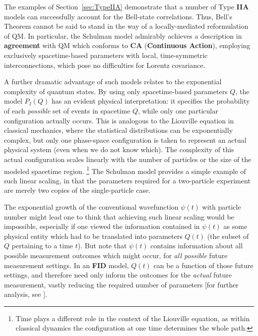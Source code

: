 \documentclass[rmp, aps, preprint, longbibliography]{revtex4-1}
\begin{document}
The examples of Section~\ref{sec:TypeIIA} demonstrate that a number of Type {\bf IIA} models can successfully account for the Bell-state correlations.  Thus, Bell's Theorem cannot be said to stand in the way of a locally-mediated reformulation of QM\@. In particular, the Schulman model admirably achieves a description in {\bf agreement} with QM which conforms to {\bf CA} ({\bf Continuous Action}), employing exclusively spacetime-based parameters with local, time-symmetric interconnections, which pose no difficulties for Lorentz covariance. 

A further dramatic advantage of such models relates to the exponential complexity of quantum states.  By using only spacetime-based parameters $Q$, the model $P_I(Q)$ has an evident physical interpretation: it specifies the probability of each \emph{possible} set of events in spacetime $Q$, while only one particular configuration actually occurs.  This is analogous to the Liouville equation in classical mechanics, where the statistical distributions can be exponentially complex, but only one phase-space configuration is taken to represent an actual physical system (even when we do not know which).  The complexity of this actual configuration scales linearly with the number of particles or the size of the modeled spacetime region.%
\footnote{Time plays a different role in the context of the Liouville equation, as within classical dynamics the configuration at one time determines the whole path.}
The Schulman model provides a simple example of such linear scaling, in that the parameters required for a two-particle experiment are merely two copies of the single-particle case. 

The exponential growth of the conventional wavefunction $\psi(t)$ with particle number might lead one to think 
that achieving such linear scaling would be impossible, especially if one viewed the information contained in $\psi(t)$ as some physical entity which had to be translated into parameters $Q(t)$ (the subset of $Q$ pertaining to a time $t$).  But note that $\psi(t)$ contains information about all possible measurement outcomes which might occur, for \emph{all possible} future measurement settings.  In an {\bf FID} model, $Q(t)$ can be a function of those future settings, and therefore need only inform the outcomes for the \emph{actual} future measurement, vastly reducing the required number of parameters [for further analysis, see \textcite{wharton2014}].
\end{document}
